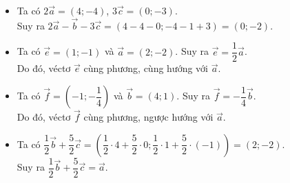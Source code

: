 \def\writeANS{\TLdung{A}\TLdung{B}\TLsai{C}\TLdung{D}}
\begin{loigiaiex}{15}
  \begin {itemize} \item Ta có $2\overrightarrow {a}=(4;-4)$, $3\overrightarrow {c}=(0;-3)$.\\ Suy ra $2\overrightarrow {a}-\overrightarrow {b}-3\overrightarrow {c}=(4-4-0;-4-1+3)=(0;-2)$. \item Ta có $\overrightarrow {e}=(1;-1)$ và $\overrightarrow {a}=(2;-2)$. Suy ra $\overrightarrow {e}=\dfrac {1}{2}\overrightarrow {a}$.\\ Do đó, véctơ $\overrightarrow {e}$ cùng phương, cùng hướng với $\overrightarrow {a}$. \item Ta có $\overrightarrow {f}=\left (-1 ;-\dfrac {1}{4}\right )$ và $\overrightarrow {b}=(4;1)$. Suy ra $\overrightarrow {f}=-\dfrac {1}{4}\overrightarrow {b}$.\\ Do đó, véctơ $\overrightarrow {f}$ cùng phương, ngược hướng với $\overrightarrow {a}$. \item Ta có $\dfrac {1}{2} \overrightarrow {b}+\dfrac {5}{2} \overrightarrow {c}=\left (\dfrac {1}{2}\cdot 4+\dfrac {5}{2}\cdot 0; \dfrac {1}{2}\cdot 1+\dfrac {5}{2}\cdot (-1) \right )=(2;-2)$.\\ Suy ra $\dfrac {1}{2} \overrightarrow {b}+\dfrac {5}{2} \overrightarrow {c}=\overrightarrow {a}$. \end {itemize}  \phantom {a}\hfill { \faKey ~\writeANS } 
\end{loigiaiex}
\def\writeANS{\TLsai{A}\TLsai{B}\TLdung{C}\TLsai{D}}
